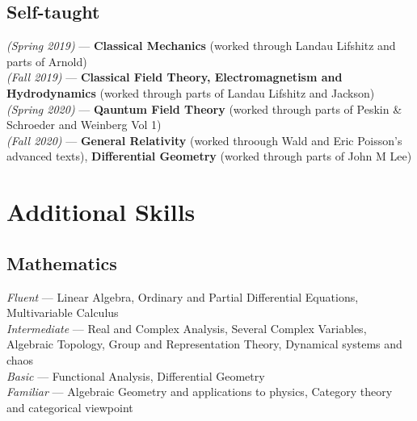 \documentclass[11pt, a4paper]{article}
\begin{document}
\subsection{\large Self-taught}
\hspace{0.01\linewidth}
\parbox{0.88\linewidth}{
    {\textit{(Spring 2019)} --- \small \textbf{Classical Mechanics} (worked through Landau Lifshitz and parts of Arnold)} \\
    {\textit{(Fall 2019)} --- \small \textbf{Classical Field Theory, Electromagnetism and Hydrodynamics} (worked through parts of Landau Lifshitz and Jackson)} \\
    {\textit{(Spring 2020)} --- \small \textbf{Qauntum Field Theory} (worked through parts of Peskin \& Schroeder and Weinberg Vol 1)} \\
    {\textit{(Fall 2020)} --- \small \textbf{General Relativity} (worked throough Wald and Eric Poisson's advanced texts), \textbf{Differential Geometry} (worked through parts of John M Lee)}
}


\section{Additional Skills}

\subsection{\large Mathematics}
\hspace{0.01\linewidth}
\parbox{0.88\linewidth}{
    {\textit{Fluent} --- \small Linear Algebra, Ordinary and Partial Differential Equations, Multivariable Calculus} \\
    {\textit{Intermediate} --- \small Real and Complex Analysis, Several Complex Variables, Algebraic Topology, Group and Representation Theory, Dynamical systems and chaos} \\
    {\textit{Basic} --- \small Functional Analysis, Differential Geometry} \\
    {\textit{Familiar} --- \small Algebraic Geometry and applications to physics, Category theory and categorical viewpoint}
}
\vspace{-0.3cm}
\end{document}

